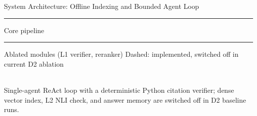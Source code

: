 \documentclass[aspectratio=1610,11pt]{beamer}
\begin{document}
\begin{frame}{System Architecture: Offline Indexing and Bounded Agent Loop}
  \centering

  \vspace{2pt}
  {\scriptsize \textcolor{primaryblue}{\rule{5pt}{5pt}} Core pipeline \quad \textcolor{orange}{\rule{5pt}{5pt}} Ablated modules (L1 verifier, reranker) \quad Dashed: implemented, switched off in current D2 ablation}\\[1pt]
  \footnotesize Single-agent ReAct loop with a deterministic Python citation verifier; dense vector index, L2 NLI check, and answer memory are switched off in D2 baseline runs.
\end{frame}
\end{document}

